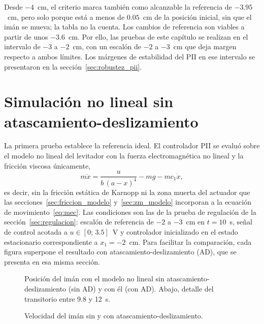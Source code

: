 Desde $-4$~cm, el criterio marca también como alcanzable la referencia de $-3.95$~cm, pero solo porque está a menos de $0.05$~cm de la posición inicial, sin que el imán se mueva; la tabla no la cuenta. Los cambios de referencia son viables a partir de unos $-3.6$~cm. Por ello, las pruebas de este capítulo se realizan en el intervalo de $-3$ a $-2$~cm, con un escalón de $-2$ a $-3$~cm que deja margen respecto a ambos límites. Los márgenes de estabilidad del PII en ese intervalo se presentaron en la sección~\ref{sec:robustez_pii}.

\section{Simulación no lineal sin atascamiento-deslizamiento}

La primera prueba establece la referencia ideal. El controlador PII se evaluó sobre el modelo no lineal del levitador con la fuerza electromagnética no lineal y la fricción viscosa únicamente,
\begin{equation}
m\ddot{x} = \frac{u}{b\,(a-x)^4} - m g - m c_1 \dot{x} ,
\label{eq:nl_sin_ad}
\end{equation}
es decir, sin la fricción estática de Karnopp ni la zona muerta del actuador que las secciones~\ref{sec:friccion_modelo} y~\ref{sec:zm_modelo} incorporan a la ecuación de movimiento~\eqref{eq:mec}. Las condiciones son las de la prueba de regulación de la sección~\ref{sec:regulacion}: escalón de referencia de $-2$ a $-3$~cm en $t=10$~s, señal de control acotada a $u\in[0;\,3.5]$~V y controlador inicializado en el estado estacionario correspondiente a $x_1=-2$~cm. Para facilitar la comparación, cada figura superpone el resultado con atascamiento-deslizamiento (AD), que se presenta en esa misma sección.

\begin{figure}[ht]
    \centering
    
    \caption[Sin AD: posición]{Posición del imán con el modelo no lineal sin atascamiento-deslizamiento (sin AD) y con él (con AD). Abajo, detalle del transitorio entre 9.8 y 12~s.}
    \label{fig:sinad_pos}
\end{figure}

\begin{figure}[ht]
    \centering
    
    \caption[Sin AD: velocidad]{Velocidad del imán sin y con atascamiento-deslizamiento.}
    \label{fig:sinad_vel}
\end{figure}

